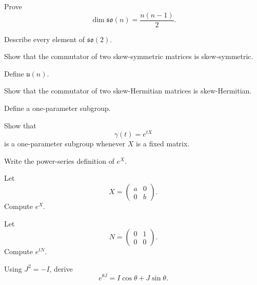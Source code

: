 \begin{exercise}[2]
Prove
\[ \dim\mathfrak{so}(n)=\frac{n(n-1)}{2}. \]
\end{exercise}

\begin{exercise}[1]
Describe every element of \(\mathfrak{so}(2)\).
\end{exercise}

\begin{exercise}[2]
Show that the commutator of two skew-symmetric matrices is skew-symmetric.
\end{exercise}

\begin{exercise}[1]
Define \(\mathfrak{u}(n)\).
\end{exercise}

\begin{exercise}[2]
Show that the commutator of two skew-Hermitian matrices is skew-Hermitian.
\end{exercise}

\begin{exercise}[1]
Define a one-parameter subgroup.
\end{exercise}

\begin{exercise}[2]
Show that
\[ \gamma(t)=e^{tX} \]
is a one-parameter subgroup whenever \(X\) is a fixed matrix.
\end{exercise}

\begin{exercise}[1]
Write the power-series definition of \(e^X\).
\end{exercise}

\begin{exercise}[2]
Let
\[ X=\begin{pmatrix}a&0\\0&b\end{pmatrix}. \]
Compute \(e^X\).
\end{exercise}

\begin{exercise}[2]
Let
\[ N=\begin{pmatrix}0&1\\0&0\end{pmatrix}. \]
Compute \(e^{tN}\).
\end{exercise}

\begin{exercise}[2]
Using \(J^2=-I\), derive
\[ e^{\theta J}=I\cos\theta+J\sin\theta. \]
\end{exercise}

